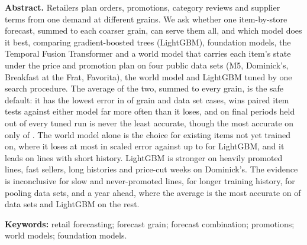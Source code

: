 \small
\textbf{Abstract.}
Retailers plan orders, promotions, category reviews and supplier terms from one demand at
different grains. We ask whether one item-by-store forecast, summed to each coarser grain, can serve
them all, and which model does it best, comparing gradient-boosted trees (LightGBM), foundation
models, the Temporal Fusion Transformer and a world model that carries each item's state under the
price and promotion plan on four public data sets (M5, Dominick's, Breakfast at the Frat, Favorita),
the world model and LightGBM tuned by one search procedure. The average of the two, summed to every
grain, is the safe default: it has the lowest error in \rqAvgBestCells{} of \rqCells{} grain and data
set cases, wins paired item tests against either model far more often than it loses, and on final
periods held out of every tuned run is never the least accurate, though the most accurate on only
\hoAvgBest{} of \hoSets{}. The world model alone is the choice for existing items not yet trained on, where it
loses at most \rqCostWmItemHi{} in scaled error against up to \rqCostLgbItemHi{} for LightGBM, and it
leads on lines with short history. LightGBM is stronger on heavily promoted lines, fast sellers,
long histories and price-cut weeks on Dominick's. The evidence is inconclusive for slow and
never-promoted lines, for longer training history, for pooling data sets, and a year ahead, where
the average is the most accurate on \lhLowestAvgDirect{} of \lhSets{} data sets and LightGBM on the rest.

\vspace{4pt}
\textbf{Keywords:} retail forecasting; forecast grain;
forecast combination; promotions; world models; foundation models.
